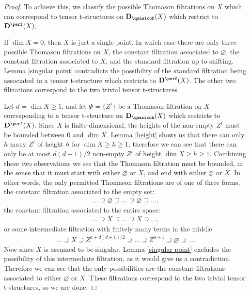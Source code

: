 \begin{proof}
To achieve this, we classify the possible Thomason filtrations on $X$ which can correspond to tensor t-structures on $\mathbf{D}_{\quasicoh}(X)$ which restrict to $\mathbf{D}^{\perf}(X)$.

If $\dim X=0$, then $X$ is just a single point. In which case there are only three possible Thomason filtrations on $X$, the constant filtration associated to $\varnothing$, the constant filtration associated to $X$, and the standard filtration up to shifting. Lemma \ref{singular point} contradicts the possibility of the standard filtration being associated to a tensor t-structure which restricts to $\mathbf{D}^{\perf}(X)$. The other two filtrations correspond to the two trivial tensor t-structures.


Let $d=\dim X \geq 1$, and let $\Phi=\{Z^i\}$ be a Thomason filtration on $X$ corresponding to a tensor t-structure on $\mathbf{D}_{\quasicoh}(X)$ which restricts to $\mathbf{D}^{\perf}(X)$. Since $X$ is finite-dimensional, the heights of the non-empty $Z^i$ must be bounded between $0$ and $\dim X$. Lemma \ref{height} shows us that there can only $h$ many $Z^i$ of height $h$ for $\dim X \geq h\geq 1$, therefore we can see that there can only be at most $d(d+1)/2$ non-empty $Z^i$ of height $\dim X \geq h\geq 1$. Combining these two observations we see that the Thomason filtration must be bounded, in the sense that it must start with either $\varnothing$ or $X$, and end with either $\varnothing$ or $X$. In other words, the only permitted Thomason filtrations are of one of three forms, the constant filtration associated to the empty set: \begin{align*}
        \dots \supseteq \varnothing \supseteq \dots \supseteq \varnothing \supseteq \dots,
    \end{align*}
    the constant filtration associated to the entire space:
     \begin{align*}
        \dots \supseteq X \supseteq \dots \supseteq X \supseteq \dots,
    \end{align*}
    or some intermediate filtration with finitely many terms in the middle
         \begin{align*}
        \dots \supseteq X \supseteq Z^{a + d(d+1)/2} \supseteq \dots \supseteq Z^{a + 1}  \supseteq \varnothing \supseteq \dots.
    \end{align*}
    Now since $X$ is assumed to be singular, Lemma \ref{singular point} excludes the possibility of this intermediate filtration, as it would give us a contradiction. Therefore we can see that the only possibilities are the constant filtrations associated to either $\varnothing$ or $X$. These filtrations correspond to the two trivial tensor t-structures, so we are done.
\end{proof}

